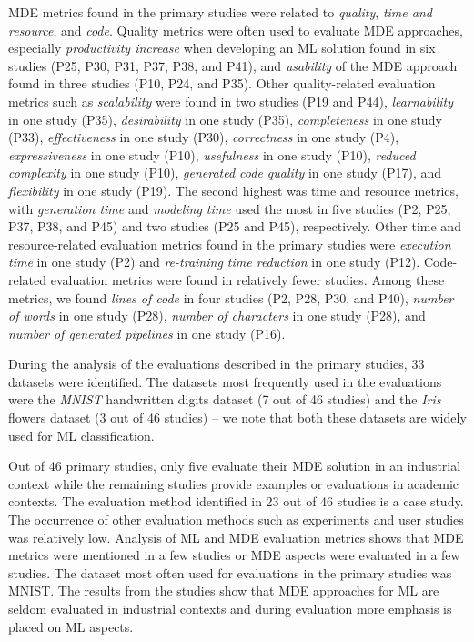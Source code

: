 MDE metrics found in the primary studies were related to \textit{quality}, \textit{time and resource}, and \textit{code}. Quality metrics were often used to evaluate MDE approaches, especially \textit{productivity increase} when developing an ML solution found in six studies (P25, P30, P31, P37, P38, and P41), and \textit{usability} of the MDE approach found in three studies (P10, P24, and P35).  Other quality-related evaluation metrics such as \textit{scalability} were found in two studies (P19 and P44), \textit{learnability} in one study (P35), \textit{desirability} in one study (P35), \textit{completeness} in one study (P33), \textit{effectiveness} in one study (P30), \textit{correctness} in one study (P4), \textit{expressiveness} in one study (P10), \textit{usefulness} in one study (P10), \textit{reduced complexity}	in one study (P10), \textit{generated code quality} in one study (P17), and \textit{flexibility} in one study (P19). The second highest was time and resource metrics, with \textit{generation time} and \textit{modeling time} used the most in five studies (P2, P25, P37, P38, and P45) and two studies (P25 and P45), respectively. Other time and resource-related evaluation metrics found in the primary studies were \textit{execution time} in one study (P2) and \textit{re-training time reduction} in one study (P12). Code-related evaluation metrics were found in relatively fewer studies. Among these metrics, we found \textit{lines of code} in four studies (P2, P28, P30, and P40), \textit{number of words} in one study (P28), \textit{number of characters} in one study (P28), and \textit{number of generated pipelines} in one study (P16).

During the analysis of the evaluations described in the primary studies, 33 datasets were identified. The datasets most frequently used in the evaluations were the \textit{MNIST} handwritten digits dataset (7 out of 46 studies) and the \textit{Iris} flowers dataset (3 out of 46 studies) -- we note that both these datasets are widely used for ML classification.

\begin{center}
\begin{myframe}[width=45em,top=5pt,bottom=5pt,left=5pt,right=5pt,arc=10pt,auto outer arc,title=\centering\textbf{RQ3 Answer Summary}]
\footnotesize
Out of 46 primary studies, only five evaluate their MDE solution in an industrial context while the remaining studies provide examples or evaluations in academic contexts. The evaluation method identified in 23 out of 46 studies is a case study. The occurrence of other evaluation methods such as experiments and user studies was relatively low. Analysis of ML and MDE evaluation metrics shows that MDE metrics were mentioned in a few studies or MDE aspects were evaluated in a few studies. The dataset most often used for evaluations in the primary studies was MNIST. The results from the studies show that MDE approaches for ML are seldom evaluated in industrial contexts and during evaluation more emphasis is placed on ML aspects.
    \end{myframe}
\end{center}

